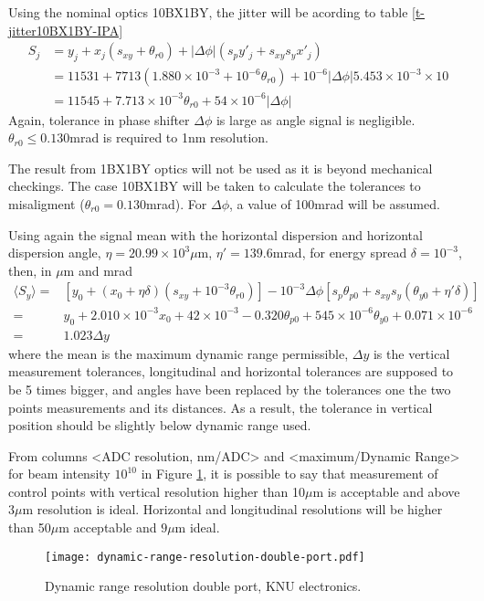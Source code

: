 Using the nominal optics 10BX1BY, the jitter will be acording to table \ref{t-jitter10BX1BY-IPA}
\begin{align*}
S_j&=y_j+x_j(s_{xy}+\theta_{r0})+|\Delta\phi|(s_py'_j+s_{xy}s_yx'_j)\\
 &=11531+7713(1.880\times10^{-3}+10^{-6}\theta_{r0})+10^{-6}|\Delta\phi|5.453\times10^{-3}\times10\\
 &=11545+7.713\times10^{-3}\theta_{r0}+54\times10^{-6}|\Delta\phi|
\end{align*}
Again, tolerance in phase shifter $\Delta\phi$ is large as angle signal is negligible. $\theta_{r0}\leq 0.130$mrad is required to 1nm resolution.\par
The result from 1BX1BY optics will not be used as it is beyond mechanical checkings. The case 10BX1BY will be taken to calculate the tolerances to misaligment ($\theta_{r0}= 0.130$mrad). For $\Delta\phi$, a value of 100mrad will be assumed.\par
Using again the signal mean with the horizontal dispersion and horizontal dispersion angle,  $\eta=20.99\times10^{3}\mu$m, $\eta'=139.6$mrad, for energy spread $\delta=10^{-3}$, then, in $\mu$m and mrad
\begin{align*}
  \langle S_y\rangle =& [y_0+(x_0+\eta\delta)(s_{xy}+10^{-3}\theta_{r0})]-10^{-3}\Delta\phi[s_p\theta_{p0}+s_{xy}s_y(\theta_{y0}+\eta'\delta)]\\
 =& y_0+2.010\times10^{-3}x_0+42\times10^{-3}-0.320\theta_{p0}+545\times10^{-6}\theta_{y0}+0.071\times10^{-6}\\
 =&1.023\Delta y
\end{align*}
where the mean is the maximum dynamic range permissible, $\Delta y$ is the vertical measurement tolerances, longitudinal and horizontal tolerances are supposed to be 5 times bigger, and angles have been replaced by the tolerances one the two points measurements and its distances. As a result, the tolerance in vertical position should be slightly below dynamic range used.\par
From columns <ADC resolution, nm/ADC> and <maximum/Dynamic Range> for beam intensity $10^{10}$ in Figure \ref{f-dynrange-KNU}, it is possible to say that measurement of control points with vertical resolution higher than 10$\mu$m is acceptable and above $3\mu$m resolution is ideal. Horizontal and longitudinal resolutions will be higher than 50$\mu$m acceptable and $9\mu$m ideal.
\begin{figure}[htb]
 \begin{center}
  \texttt{[image: dynamic-range-resolution-double-port.pdf]}\caption{Dynamic range resolution double port, KNU electronics.}\label{f-dynrange-KNU}
 \end{center}
\end{figure}

